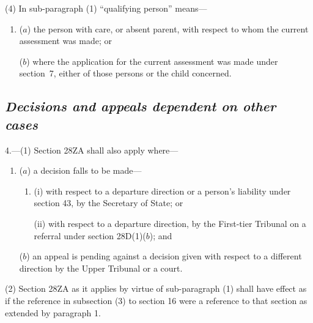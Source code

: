 \documentclass[12pt,a4paper]{article}
\begin{document}
(4) In sub-paragraph (1) “qualifying person” means—
\begin{enumerate}\item[]
($a$) the person with care, or absent parent, with respect to whom the current assessment was made; or

($b$) where the application for the current assessment was made under section~7, either of those persons or the child concerned.
\end{enumerate}


\subsection*{\itshape Decisions and appeals dependent on other cases}

4.---(1) Section 28ZA shall also apply where—
\begin{enumerate}\item[]
($a$) a decision falls to be made—
\begin{enumerate}\item[]
(i) with respect to a departure direction
or a person’s liability under section 43, by the Secretary of State; or

(ii) with respect to a departure direction, by 
the First-tier Tribunal  %
on a referral under section 28D(1)($b$); and
\end{enumerate}

($b$) an appeal is pending against a decision given with respect to a different direction by 
the Upper Tribunal  %
or a court.
\end{enumerate}

(2) Section 28ZA as it applies by virtue of sub-paragraph (1) shall have effect as if the reference in subsection (3) to section 16 were a reference to that section as extended by paragraph 1.
\end{document}
